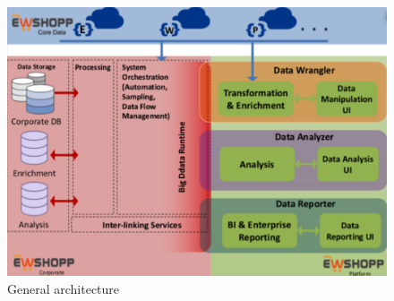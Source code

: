\begin{figure}[t]
\centering
\includegraphics[width=\columnwidth]{figs/Architecture.pdf}
\vspace{-.3cm}
\caption{General architecture}
\label{fig:architecture} 
\end{figure}  

 
 
